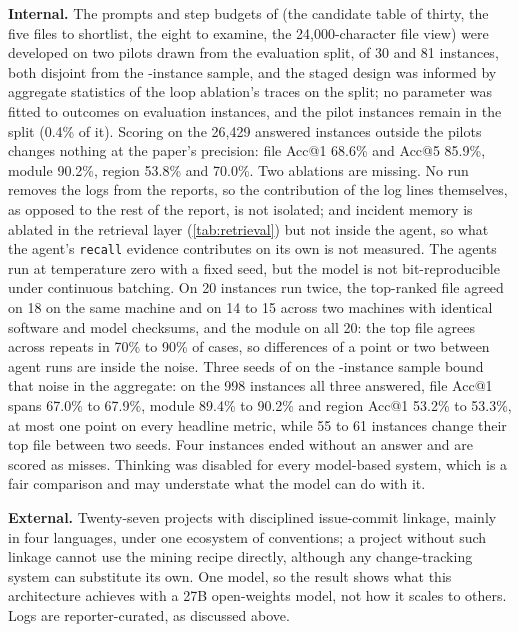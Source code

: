 \textbf{Internal.} The prompts and step budgets of \sys{} (the
candidate table of thirty, the five files to shortlist, the eight to
examine, the 24{,}000-character file view) were developed on two
pilots drawn from the evaluation split, of 30 and 81 instances, both
disjoint from the \nSample-instance sample, and the staged design was
informed by aggregate statistics of the loop ablation's traces on the
split; no parameter was fitted to outcomes on evaluation instances, and
the pilot instances remain in the split (0.4\% of it). Scoring \sys{}
on the 26{,}429 answered instances outside the pilots changes nothing at the
paper's precision: file Acc@1 68.6\% and Acc@5 85.9\%, module 90.2\%,
region 53.8\% and 70.0\%. Two ablations
are missing. No run removes the logs from the reports, so the
contribution of the log lines themselves, as opposed to the rest of
the report, is not isolated; and incident memory is ablated in the
retrieval layer (\cref{tab:retrieval}) but not inside the agent, so
what the agent's \texttt{recall} evidence contributes on its own is not
measured. The agents run at temperature zero with a fixed seed, but
the model is not bit-reproducible under continuous batching.
On 20 instances run twice, the top-ranked file agreed on 18 on the same
machine and on 14 to 15 across two machines with identical software and
model checksums, and the module on all 20: the top file agrees across
repeats in 70\% to 90\% of cases, so differences of a point or two
between agent runs are inside the noise. Three seeds of \sys{} on
the \nSample-instance sample bound that noise in the aggregate: on the
998 instances all three answered, file Acc@1 spans 67.0\% to 67.9\%,
module 89.4\% to 90.2\% and region Acc@1 53.2\% to 53.3\%, at most
one point on every headline metric, while 55 to 61 instances change
their top file between two seeds. Four instances ended without an answer and are
scored as misses. Thinking was disabled for every model-based system,
which is a fair comparison and may understate what the model can do
with it.

\textbf{External.} Twenty-seven projects with disciplined issue-commit
linkage, mainly in four languages, under one ecosystem of conventions; a
project without such linkage cannot use the mining recipe directly,
although any change-tracking system can substitute its own. One model,
so the result shows what this architecture achieves with a 27B
open-weights model, not how it scales to others. Logs are
reporter-curated, as discussed above.

